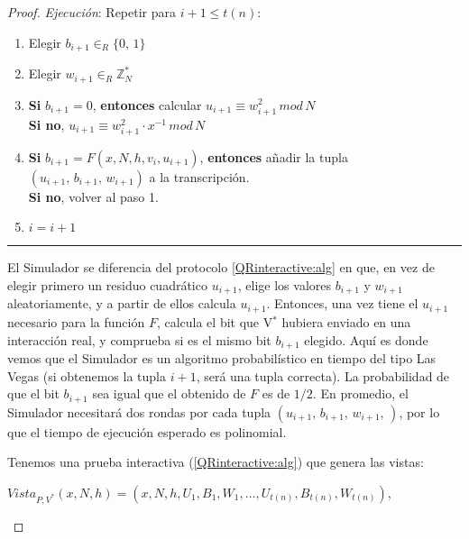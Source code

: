 \begin{proof}
	\textit{Ejecución}: Repetir para $i+1 \leq t(n)$:
	
	\begin{enumerate}
		\item Elegir $b_{i+1} \in_R \{0,\,1\}$
		
		\item Elegir $w_{i+1} \in_R \mathbb{Z}^*_N$
		
		\item \textbf{Si} $b_{i+1} = 0$, \textbf{entonces} calcular \qquad $u_{i+1} \equiv w_{i+1}^2 \, mod \,  N$ \\
			  \textbf{Si no}, \qquad \qquad \qquad \qquad \qquad \qquad \: $u_{i+1} \equiv w_{i+1}^2 \cdot x^{-1} \, mod \,  N$
			  
		\item \textbf{Si} $b_{i+1} = F(x,N,h,v_i,u_{i+1})$, \textbf{entonces} añadir la tupla \\ $(u_{i+1},\,b_{i+1},\,w_{i+1})$ a la transcripción. \\
			  \textbf{Si no}, volver al paso 1.
		
		\item $i = i+1$
		
	\end{enumerate}
	
	\rule{\textwidth}{1pt}
	
	\hfill
	
	El Simulador se diferencia del protocolo \ref{QRinteractive:alg} en que, en vez de elegir primero un residuo cuadrático $u_{i+1}$, elige los valores $b_{i+1}$ y $w_{i+1}$ aleatoriamente, y a partir de ellos calcula $u_{i+1}$. Entonces, una vez tiene el $u_{i+1}$ necesario para la función $F$, calcula el bit que V$^*$ hubiera enviado en una interacción real, y comprueba si es el mismo bit $b_{i+1}$ elegido. Aquí es donde vemos que el Simulador es un algoritmo probabilístico en tiempo del tipo Las Vegas (si obtenemos la tupla $i+1$, será una tupla correcta). La probabilidad de que el bit $b_{i+1}$ sea igual que el obtenido de $F$ es de $1/2$. En promedio, el Simulador necesitará dos rondas por cada tupla $(u_{i+1},\,b_{i+1},\,w_{i+1},\,)$, por lo que el tiempo de ejecución esperado es polinomial. 
	
	
	\hfil
	
	Tenemos una prueba interactiva (\ref{QRinteractive:alg}) que genera las vistas:
	
	 \begin{center}
	 	$Vista_{P,V^*}(x,N,h) = (x,N,h,U_1,B_1,W_1,\dots , U_{t(n)}, B_{t(n)}, W_{t(n)})$,
	 \end{center}
	 

\end{proof}
